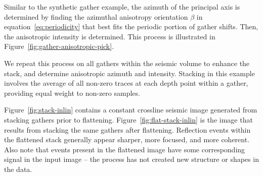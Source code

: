 Similar to the synthetic gather example, the azimuth of the principal axis  is determined by finding the azimuthal anisotropy orientation $\beta$ in equation~\ref{eq:periodicity} that best fits the periodic portion of gather shifts.  Then, the anisotropic intensity is determined. This process is illustrated in Figure~\ref{fig:gather-anisotropic-pick}.


We repeat this process on all gathers within the seismic volume to enhance the stack, and determine anisotropic azimuth and intensity.  Stacking in this example involves the average of all non-zero traces at each depth point within a gather, providing equal weight to non-zero samples.





Figure~\ref{fig:stack-inlin} contains a constant crossline seismic image generated from stacking gathers prior to flattening. Figure~\ref{fig:flat-stack-inlin} is the image that results from stacking the same gathers after flattening.  Reflection events within the flattened stack generally appear sharper, more focused, and more coherent.  Also note that events present in the flattened image have some corresponding signal in the input image -- the process has not created new structure or shapes in the data.




